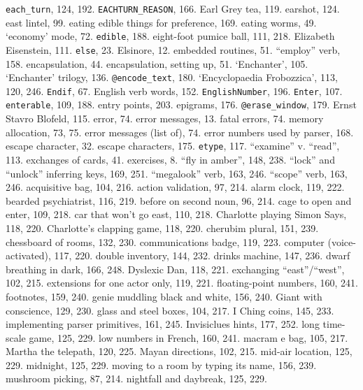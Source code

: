 {{\tt each\_turn}}, 124, 192.
{{\tt EACHTURN\_REASON}}, 166.
Earl Grey tea, 119.
earshot, 124.
east lintel, 99.
eating edible things for preference, 169.
eating worms, 49.
`economy' mode, 72.
{{\tt edible}}, 188.
eight-foot pumice ball, 111, 218.
Elizabeth Eisenstein, 111.
{{\tt else}}, 23.
Elsinore, 12.
embedded routines, 51.
``employ'' verb, 158.
encapsulation, 44.
encapsulation, setting up, 51.
`Enchanter', 105.
`Enchanter' trilogy, 136.
{{\tt @encode\_text}}, 180.
`Encyclopaedia Frobozzica', 113, 120, 246.
{{\tt Endif}}, 67.
English verb words, 152.
{{\tt EnglishNumber}}, 196.
{{\tt Enter}}, 107.
{{\tt enterable}}, 109, 188.
entry points, 203.
epigrams, 176.
{{\tt @erase\_window}}, 179.
Ernst Stavro Blofeld, 115.
error, 74.
error messages, 13.
\quad  fatal errors, 74.
\quad  memory allocation, 73, 75.
error messages (list of), 74.
error numbers used by parser, 168.
escape character, 32.
escape characters, 175.
{{\tt etype}}, 117.
``examine'' v. ``read'', 113.
exchanges of cards, 41.
exercises, 8.
\quad  ``fly in amber'', 148, 238.
\quad  ``lock'' and ``unlock'' inferring keys, 169, 251.
\quad  ``megalook'' verb, 163, 246.
\quad  ``scope'' verb, 163, 246.
\quad  acquisitive bag, 104, 216.
\quad  action validation, 97, 214.
\quad  alarm clock, 119, 222.
\quad  bearded psychiatrist, 116, 219.
\quad  before on second noun, 96, 214.
\quad  cage to open and enter, 109, 218.
\quad  car that won't go east, 110, 218.
\quad  Charlotte playing Simon Says, 118, 220.
\quad  Charlotte's clapping game, 118, 220.
\quad  cherubim plural, 151, 239.
\quad  chessboard of rooms, 132, 230.
\quad  communications badge, 119, 223.
\quad  computer (voice-activated), 117, 220.
\quad  double inventory, 144, 232.
\quad  drinks machine, 147, 236.
\quad  dwarf breathing in dark, 166, 248.
\quad  Dyslexic Dan, 118, 221.
\quad  exchanging ``east''/``west'', 102, 215.
\quad  extensions for one actor only, 119, 221.
\quad  floating-point numbers, 160, 241.
\quad  footnotes, 159, 240.
\quad  genie muddling black and white, 156, 240.
\quad  Giant with conscience, 129, 230.
\quad  glass and steel boxes, 104, 217.
\quad  I Ching coins, 145, 233.
\quad  implementing parser primitives, 161, 245.
\quad  Invisiclues hints, 177, 252.
\quad  long time-scale game, 125, 229.
\quad  low numbers in French, 160, 241.
\quad  macram{ e} bag, 105, 217.
\quad  Martha the telepath, 120, 225.
\quad  Mayan directions, 102, 215.
\quad  mid-air location, 125, 229.
\quad  midnight, 125, 229.
\quad  moving to a room by typing its name, 156, 239.
\quad  mushroom picking, 87, 214.
\quad  nightfall and daybreak, 125, 229.
